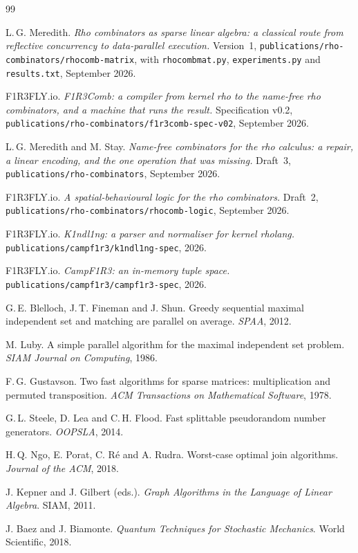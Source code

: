 \documentclass[11pt,a4paper]{article}
\newcommand{\code}[1]{\texttt{#1}}
\theoremstyle{definition}
\theoremstyle{plain}
\begin{document}
\begin{thebibliography}{99}

 L.\,G. Meredith.
\emph{Rho combinators as sparse linear algebra: a classical route from
reflective concurrency to data-parallel execution.} Version~1,
\code{publications/rho-combinators/rhocomb-matrix}, with
\code{rhocombmat.py}, \code{experiments.py} and \code{results.txt},
September 2026.

 F1R3FLY.io.
\emph{F1R3Comb: a compiler from kernel rho to the name-free rho combinators,
and a machine that runs the result.} Specification v0.2,
\code{publications/rho-combinators/f1r3comb-spec-v02}, September 2026.

 L.\,G. Meredith and M. Stay.
\emph{Name-free combinators for the rho calculus: a repair, a linear encoding,
and the one operation that was missing.} Draft~3,
\code{publications/rho-combinators}, September 2026.

 F1R3FLY.io.
\emph{A spatial-behavioural logic for the rho combinators.} Draft~2,
\code{publications/rho-combinators/rhocomb-logic}, September 2026.

 F1R3FLY.io.
\emph{K1ndl1ng: a parser and normaliser for kernel rholang.}
\code{publications/campf1r3/k1ndl1ng-spec}, 2026.

 F1R3FLY.io.
\emph{CampF1R3: an in-memory tuple space.}
\code{publications/campf1r3/campf1r3-spec}, 2026.

 G.\,E. Blelloch, J.\,T. Fineman and J. Shun.
Greedy sequential maximal independent set and matching are parallel on
average. \emph{SPAA}, 2012.

 M. Luby.
A simple parallel algorithm for the maximal independent set problem.
\emph{SIAM Journal on Computing}, 1986.

 F.\,G. Gustavson.
Two fast algorithms for sparse matrices: multiplication and permuted
transposition. \emph{ACM Transactions on Mathematical Software}, 1978.

 G.\,L. Steele, D. Lea and C.\,H. Flood.
Fast splittable pseudorandom number generators. \emph{OOPSLA}, 2014.

 H.\,Q. Ngo, E. Porat, C. R\'e and A. Rudra.
Worst-case optimal join algorithms. \emph{Journal of the ACM}, 2018.

 J. Kepner and J. Gilbert (eds.).
\emph{Graph Algorithms in the Language of Linear Algebra}. SIAM, 2011.

 J. Baez and J. Biamonte.
\emph{Quantum Techniques for Stochastic Mechanics}. World Scientific, 2018.

\end{thebibliography}
\end{document}
